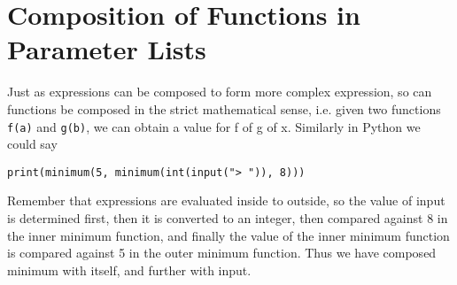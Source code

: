 \section{Composition of Functions in Parameter Lists}

Just as expressions can be composed to form more complex expression,   so can functions be composed in the strict mathematical sense, i.e.   given two functions \texttt{f(a)} and \texttt{g(b)}, we can obtain a value for f of g   of x. Similarly in Python we could say
\begin{lstlisting}
print(minimum(5, minimum(int(input("> ")), 8)))
\end{lstlisting}

Remember that expressions are evaluated inside to outside, so the   value of input is determined first, then it is converted to an   integer, then compared against 8 in the inner minimum function, and   finally the value of the inner minimum function is compared against 5   in the outer minimum function. Thus we have composed minimum with   itself, and further with input.

